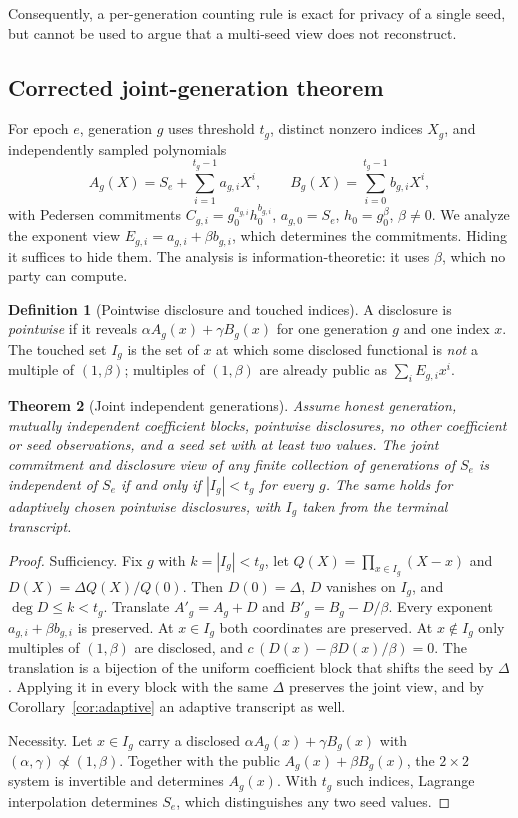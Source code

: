 \documentclass[pdflatex,sn-mathphys-num]{sn-jnl}
\theoremstyle{plain}
\newtheorem{theorem}{Theorem}
\theoremstyle{definition}
\newtheorem{definition}[theorem]{Definition}
\begin{document}
Consequently, a per-generation counting rule is exact for privacy of a single seed, but cannot be used to argue that a multi-seed view does not reconstruct.

\subsection{Corrected joint-generation theorem}
For epoch $e$, generation $g$ uses threshold $t_g$, distinct nonzero indices $X_g$, and independently sampled polynomials
\begin{equation}\label{eq:sharing}
 A_g(X)=S_e+\sum_{i=1}^{t_g-1}a_{g,i}X^i,
 \qquad B_g(X)=\sum_{i=0}^{t_g-1}b_{g,i}X^i,
\end{equation}
with Pedersen commitments $C_{g,i}=g_0^{a_{g,i}}h_0^{b_{g,i}}$, $a_{g,0}=S_e$, $h_0=g_0^\beta$, $\beta\ne0$. We analyze the exponent view $E_{g,i}=a_{g,i}+\beta b_{g,i}$, which determines the commitments. Hiding it suffices to hide them. The analysis is information-theoretic: it uses $\beta$, which no party can compute.

\begin{definition}[Pointwise disclosure and touched indices]
A disclosure is \emph{pointwise} if it reveals $\alpha A_g(x)+\gamma B_g(x)$ for one generation $g$ and one index $x$. The touched set $I_g$ is the set of $x$ at which some disclosed functional is \emph{not} a multiple of $(1,\beta)$; multiples of $(1,\beta)$ are already public as $\sum_iE_{g,i}x^i$.
\end{definition}

\begin{theorem}[Joint independent generations]\label{thm:generations}
Assume honest generation, mutually independent coefficient blocks, pointwise disclosures, no other coefficient or seed observations, and a seed set with at least two values. The joint commitment and disclosure view of any finite collection of generations of $S_e$ is independent of $S_e$ if and only if $|I_g|<t_g$ for every $g$. The same holds for adaptively chosen pointwise disclosures, with $I_g$ taken from the terminal transcript.
\end{theorem}
\begin{proof}
Sufficiency. Fix $g$ with $k=|I_g|<t_g$, let $Q(X)=\prod_{x\in I_g}(X-x)$ and $D(X)=\Delta Q(X)/Q(0)$. Then $D(0)=\Delta$, $D$ vanishes on $I_g$, and $\deg D\le k<t_g$. Translate $A'_g=A_g+D$ and $B'_g=B_g-D/\beta$. Every exponent $a_{g,i}+\beta b_{g,i}$ is preserved. At $x\in I_g$ both coordinates are preserved. At $x\notin I_g$ only multiples of $(1,\beta)$ are disclosed, and $c\,(D(x)-\beta D(x)/\beta)=0$. The translation is a bijection of the uniform coefficient block that shifts the seed by $\Delta$. Applying it in every block with the same $\Delta$ preserves the joint view, and by Corollary~\ref{cor:adaptive} an adaptive transcript as well.

Necessity. Let $x\in I_g$ carry a disclosed $\alpha A_g(x)+\gamma B_g(x)$ with $(\alpha,\gamma)\not\propto(1,\beta)$. Together with the public $A_g(x)+\beta B_g(x)$, the $2\times2$ system is invertible and determines $A_g(x)$. With $t_g$ such indices, Lagrange interpolation determines $S_e$, which distinguishes any two seed values.
\end{proof}
\end{document}
